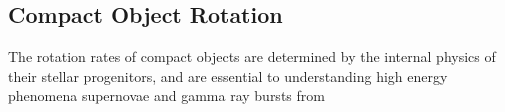 {\color{orange}

\subsection{Compact Object Rotation}

The rotation rates of compact objects are determined by the internal physics of their stellar progenitors, and are essential to understanding high energy phenomena supernovae and gamma ray bursts from 

}
